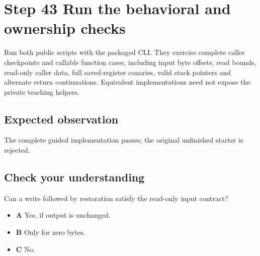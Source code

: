 \section{Step 43 Run the behavioral and ownership checks}\label{expression-s43}

Run both public scripts with the packaged CLI. They exercise complete caller checkpoints and callable function cases, including input byte offsets, read bounds, read-only caller data, full saved-register canaries, valid stack pointers and alternate return continuations. Equivalent implementations need not expose the private teaching helpers.

\subsection{Expected observation}
The complete guided implementation passes; the original unfinished starter is rejected.

\subsection{Check your understanding}
Can a write followed by restoration satisfy the read-only input contract?

\begin{itemize}
  \item \textbf{A} Yes, if output is unchanged.
  \item \textbf{B} Only for zero bytes.
  \item \textbf{C} No.
\end{itemize}
